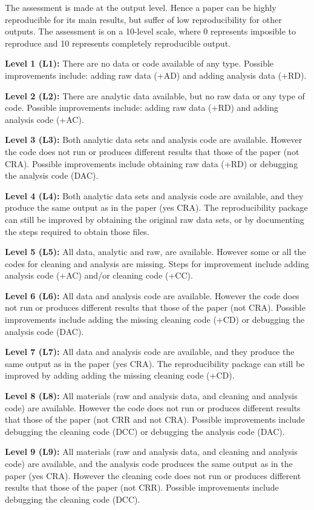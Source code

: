 \documentclass[]{book}
\begin{document}
The assessment is made at the output level. Hence a paper can be highly reproducible for its main results, but suffer of low reproducibility for other outputs. The assessment is on a 10-level scale, where 0 represents imposible to reproduce and 10 represents completely reproducible output.

\textbf{Level 1 (L1):} There are no data or code available of any type. Possible improvements include: adding raw data (+AD) and adding analysis data (+RD).

\textbf{Level 2 (L2):} There are analytic data available, but no raw data or any type of code. Possible improvements include: adding raw data (+RD) and adding analysis code (+AC).

\textbf{Level 3 (L3):} Both analytic data sets and analysis code are available. However the code does not run or produces different results that those of the paper (not CRA). Possible improvements include obtaining raw data (+RD) or debugging the analysis code (DAC).

\textbf{Level 4 (L4):} Both analytic data sets and analysis code are available, and they produce the same output as in the paper (yes CRA). The reproducibility package can still be improved by obtaining the original raw data sets, or by documenting the steps required to obtain those files.

\textbf{Level 5 (L5):} All data, analytic and raw, are available. However some or all the codes for cleaning and analysis are missing. Steps for improvement include adding analysis code (+AC) and/or cleaning code (+CC).

\textbf{Level 6 (L6):} All data and analysis code are available. However the code does not run or produces different results that those of the paper (not CRA). Possible improvements include adding the missing cleaning code (+CD) or debugging the analysis code (DAC).

\textbf{Level 7 (L7):} All data and analysis code are available, and they produce the same output as in the paper (yes CRA). The reproducibility package can still be improved by adding adding the missing cleaning code (+CD).

\textbf{Level 8 (L8):} All materials (raw and analysis data, and cleaning and analysis code) are available. However the code does not run or produces different results that those of the paper (not CRR and not CRA). Possible improvements include debugging the cleaning code (DCC) or debugging the analysis code (DAC).

\textbf{Level 9 (L9):} All materials (raw and analysis data, and cleaning and analysis code) are available, and the analysis code produces the same output as in the paper (yes CRA). However the cleaning code does not run or produces different results that those of the paper (not CRR). Possible improvements include debugging the cleaning code (DCC).
\end{document}
